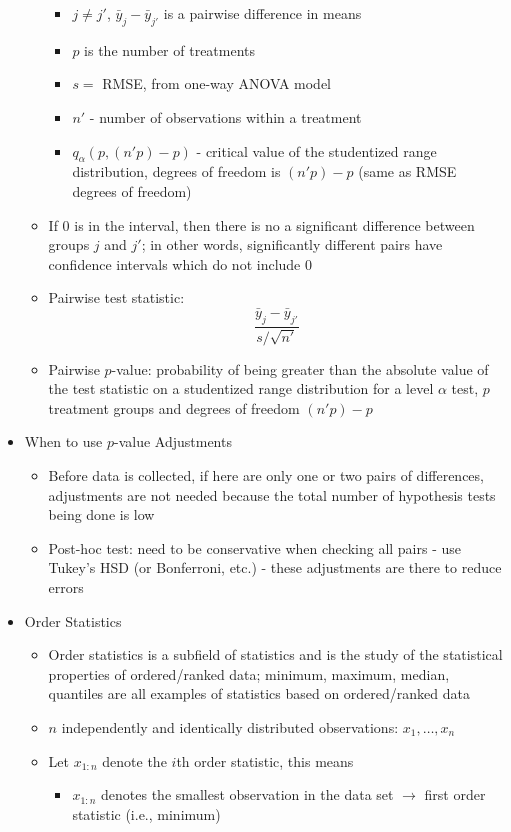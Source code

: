 \documentclass[12pt]{article}
\begin{document}
\begin{itemize}
\begin{itemize}
\begin{itemize}
\item $j \neq j'$, $\bar{y}_j - \bar{y}_{j'}$ is a pairwise difference in means 
\item $p$ is the number of treatments 
\item $s = $ RMSE, from one-way ANOVA model 
\item $n'$ - number of observations within a treatment 
\item $q_\alpha(p, (n'p) - p)$ - critical value of the studentized range distribution, degrees of freedom is $(n'p) - p$ (same as RMSE degrees of freedom) \end{itemize} 
\item If $0$ is in the interval, then there is no a significant difference between groups $j$ and $j'$; in other words, significantly different pairs have confidence intervals which do not include $0$
\item Pairwise test statistic: $$\frac{\bar{y}_j - \bar{y}_{j'}}{s / \sqrt{n'}} $$ 
\item Pairwise $p$-value: probability of being greater than the absolute value of the test statistic on a studentized range distribution for a level $\alpha$ test, $p$ treatment groups and degrees of freedom $(n' p) - p$ \end{itemize} 
\item When to use $p$-value Adjustments \begin{itemize} 
\item Before data is collected, if here are only one or two pairs of differences, adjustments are not needed because the total number of hypothesis tests being done is low
\item Post-hoc test: need to be conservative when checking all pairs - use Tukey's HSD (or Bonferroni, etc.) - these adjustments are there to reduce errors \end{itemize} 
\item Order Statistics \begin{itemize} 
\item Order statistics is a subfield of statistics and is the study of the statistical properties of ordered/ranked data; minimum, maximum, median, quantiles are all examples of statistics based on ordered/ranked data 
\item $n$ independently and identically distributed observations: $x_1,\dots,x_n$ 
\item Let $x_{1:n}$ denote the $i$th order statistic, this means \begin{itemize} 
\item $x_{1:n}$ denotes the smallest observation in the data set $\to$ first order statistic (i.e., minimum) 

\end{itemize}
\end{itemize}
\end{itemize}
\end{document}
